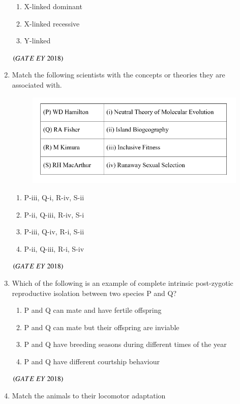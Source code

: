 \documentclass[journal]{IEEEtran}
\numberwithin{equation}{enumi}
\numberwithin{figure}{enumi}
\begin{document}
\begin{enumerate}
\begin{enumerate}
        \item X-linked dominant
        \item X-linked recessive
        \item Y-linked
    \end{enumerate}
    \hfill{$\brak{ GATE\ EY\ 2018}$}
    \bigskip
\item Match the following scientists with the concepts or theories they are associated
with.
\begin{figure}[!ht]
    \centering
    \includegraphics[width=\linewidth]{figs/14.png}
    \caption{}
    \label{fig:14}
   \end{figure}
    \begin{enumerate}
        \item P-iii, Q-i, R-iv, S-ii
        \item P-ii, Q-iii, R-iv, S-i
        \item P-iii, Q-iv, R-i, S-ii
        \item P-ii, Q-iii, R-i, S-iv
    \end{enumerate}
    \hfill{$\brak{ GATE\ EY\ 2018}$}
    \bigskip
\item Which of the following is an example of complete intrinsic post-zygotic
reproductive isolation between two species P and Q?
    \begin{enumerate}
        \item P and Q can mate and have fertile offspring
        \item P and Q can mate but their offspring are inviable
        \item P and Q have breeding seasons during different times of the year
        \item P and Q have different courtship behaviour
    \end{enumerate}
    \hfill{$\brak{ GATE\ EY\ 2018}$}
    \bigskip
\item Match the animals to their locomotor adaptation
\begin{figure}[!ht]

\end{figure}
\end{enumerate}
\end{document}
